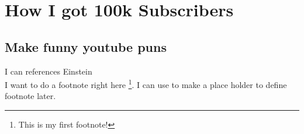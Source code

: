 \chapter{How I got 100k Subscribers}

\section{Make funny youtube puns}

I can references Einstein \cite{einstein}\\
I want to do a footnote right here \footnote{This is my first footnote!}.
I can use \footnotemark to make a place holder to define footnote later.\footnotemark[\value{footnote}]


\lipsum[1-20]